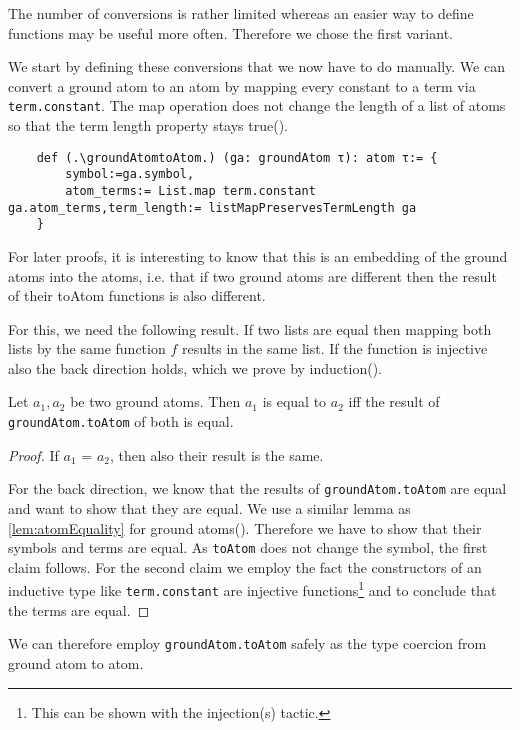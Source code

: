The number of conversions is rather limited whereas an easier way to define functions may be useful more often. Therefore we chose the first variant. 

We start by defining these conversions that we now have to do manually. We can convert a ground atom to an atom by mapping every constant to a term via \lstinline|term.constant|. The map operation does not change the length of a list of atoms so that the term length property stays true(\listMapPreservesTermLength).

\begin{lstlisting}
    def (.\groundAtomtoAtom.) (ga: groundAtom τ): atom τ:= {
        symbol:=ga.symbol, 
        atom_terms:= List.map term.constant ga.atom_terms,term_length:= listMapPreservesTermLength ga
    }
\end{lstlisting}

For later proofs, it is interesting to know that this is an embedding of the ground atoms into the atoms, i.e. that if two ground atoms are different then the result of their toAtom functions is also different.

For this, we need the following result. If two lists are equal then mapping both lists by the same function $f$ results in the same list. If the function is injective also the back direction holds, which we prove by induction(\listMapInjectiveEquality).

\begin{lemma}[\groundAtomToAtomEquality]
    Let $a_1, a_2$ be two ground atoms. Then $a_1$ is equal to $a_2$ iff the result of \lstinline|groundAtom.toAtom| of both is equal.
\end{lemma}
\begin{proof}
    If $a_1$ = $a_2$, then also their result is the same.

    For the back direction, we know that the results of \lstinline|groundAtom.toAtom| are equal and want to show that they are equal. We use a similar lemma as \cref{lem:atomEquality} for ground atoms(\groundAtomEquality). Therefore we have to show that their symbols and terms are equal. As \lstinline|toAtom| does not change the symbol, the first claim follows. For the second claim we employ the fact the constructors of an inductive type like \lstinline|term.constant| are injective functions\footnote{This can be shown with the injection(s) tactic.} and \listMapInjectiveEquality to conclude that the terms are equal.
\end{proof}

We can therefore employ \lstinline|groundAtom.toAtom| safely as the type coercion from ground atom to atom.

